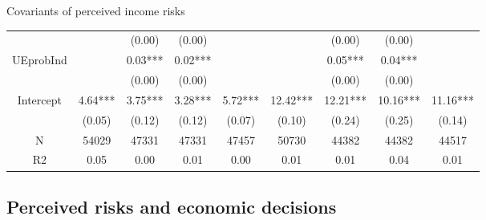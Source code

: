 \documentclass{beamer}
\begin{document}
\begin{frame}{Covariants of perceived income risks}
\begin{table}
{\begin{tabular}{ccccccccc}
	&          &    (0.00) &     (0.00) &             &           &     (0.00) &      (0.00) &              \\
	UEprobInd        &          &   0.03*** &    0.02*** &             &           &    0.05*** &     0.04*** &              \\
	&          &    (0.00) &     (0.00) &             &           &     (0.00) &      (0.00) &              \\
	Intercept        &  4.64*** &   3.75*** &    3.28*** &     5.72*** &  12.42*** &   12.21*** &    10.16*** &     11.16*** \\
	&   (0.05) &    (0.12) &     (0.12) &      (0.07) &    (0.10) &     (0.24) &      (0.25) &       (0.14) \\
	\hline 
	N                &    54029 &     47331 &      47331 &       47457 &     50730 &      44382 &       44382 &        44517 \\
	R2               &     0.05 &      0.00 &       0.01 &        0.00 &      0.01 &       0.01 &        0.04 &         0.01 \\
	\hline 
\end{tabular}
}
	\end{table}
\end{frame}


\subsection{Perceived risks and economic decisions}
\end{document}
